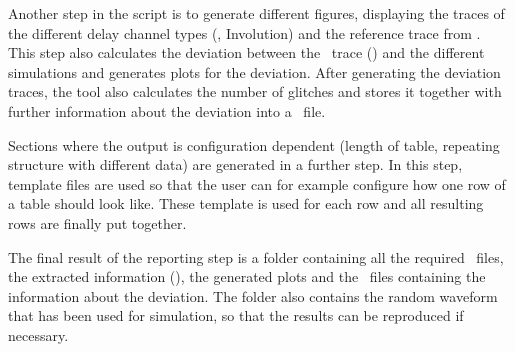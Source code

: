 Another step in the script is to generate different figures, displaying
the traces of the different delay channel types (\modelsim, Involution)
and the reference trace from \spice. This step also calculates the
deviation between the \spice\ trace (\crossingsjson) and the different
simulations and generates plots for the deviation. After generating the
deviation traces, the tool also calculates the number of glitches and
stores it together with further information about the deviation into a
\csvfile\ file.

Sections where the output is configuration dependent (length of table,
repeating structure with different data) are generated in a further
step. In this step, template files are used so that the user can for
example configure how one row of a table should look like. These
template is used for each row and all resulting rows are finally put together.

The final result of the reporting step is a folder containing all the
required \texfile\ files, the extracted information (\resultsjson),
the generated plots and the \csvfile\ files containing the information about
the deviation. The folder also contains the random waveform that has
been used for simulation, so that the results can be reproduced if
necessary.


